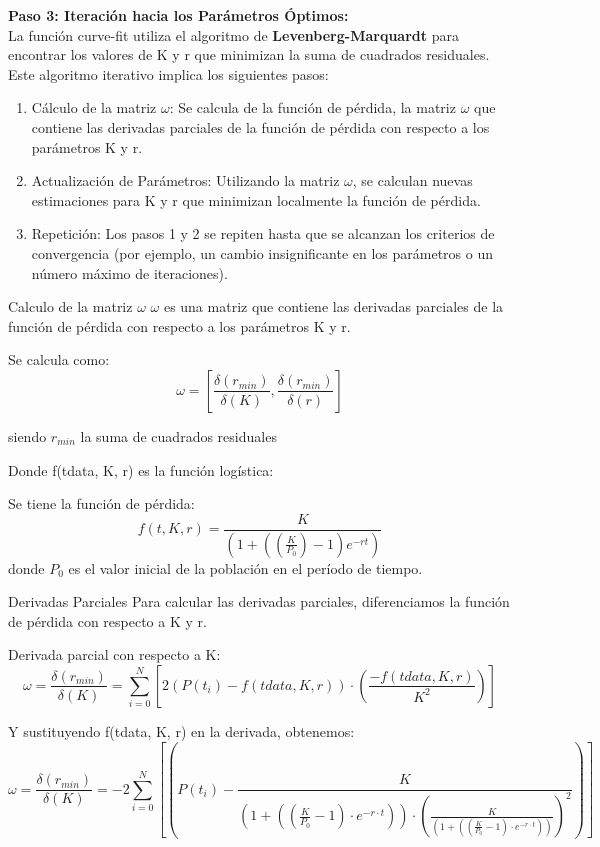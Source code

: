 \documentclass{beamer}
\begin{document}
\begin{frame}
    \textbf{Paso 3: Iteración hacia los Parámetros Óptimos:}\\
    \small{La función curve-fit utiliza el algoritmo de \textbf{Levenberg-Marquardt} para encontrar los valores de K y r que minimizan la suma de cuadrados residuales. Este algoritmo iterativo implica los siguientes pasos:}
    \begin{enumerate}
        \item \small{Cálculo de la matriz $\omega$: Se calcula de la función de pérdida, la matriz $\omega$ que contiene las derivadas parciales de la función de pérdida con respecto a los parámetros K y r.}
        \item \small{Actualización de Parámetros: Utilizando la matriz $\omega$, se calculan nuevas estimaciones para K y r que minimizan localmente la función de pérdida.}
        \item \small{Repetición: Los pasos 1 y 2 se repiten hasta que se alcanzan los criterios de convergencia (por ejemplo, un cambio insignificante en los parámetros o un número máximo de iteraciones).}
    \end{enumerate}
\end{frame}
\begin{frame}{Calculo de la matriz $\omega$}
    $\omega$ es una matriz que contiene las derivadas parciales de la función de pérdida con respecto a los parámetros K y r.
    \begin{block}{Se calcula como: }
        $$\omega = [\frac{\delta(r_{min})}{\delta(K)}, \frac{\delta(r_{min})}{\delta(r)}]$$
        
        \begin{center}\small{siendo $r_{min}$ la suma de cuadrados residuales}\end{center}
    \end{block}
    Donde f(tdata, K, r) es la función logística:
    \begin{block}{Se tiene la función de pérdida:}
    $$f(t, K, r) = \frac{K}{(1 + ((\frac{K}{P_{0}}) - 1)e^{-rt})}$$
    donde $P_{0}$ es el valor inicial de la población en el período de tiempo. 
    \end{block}
\end{frame}

\begin{frame}{Derivadas Parciales}    
\small{Para calcular las derivadas parciales, diferenciamos la función de pérdida con respecto a K y r.\\}
\begin{block}{Derivada parcial con respecto a K:}
$$\omega = \frac{\delta(r_{min})}{\delta(K)} = \sum_{i=0}^{N}[2(P(t_{i}) - f(tdata, K, r)) \cdot (\frac{-f(tdata, K, r)}{K^{2}})]$$
\end{block}
\begin{block}{Y sustituyendo  f(tdata, K, r) en la derivada, obtenemos:}
    $$\omega = \frac{\delta(r_{min})}{\delta(K)} = -2\sum_{i=0}^{N}[(P(t_{i}) - \frac{K}{(1 + ((\frac{K}{P_{0}} - 1) \cdot e^{-r \cdot t})) \cdot (\frac{K}{(1 + ((\frac{K}{P_{0}} - 1) \cdot e^{-r \cdot t}))})^{2}})]$$    
\end{block}
\end{frame}
\end{document}
